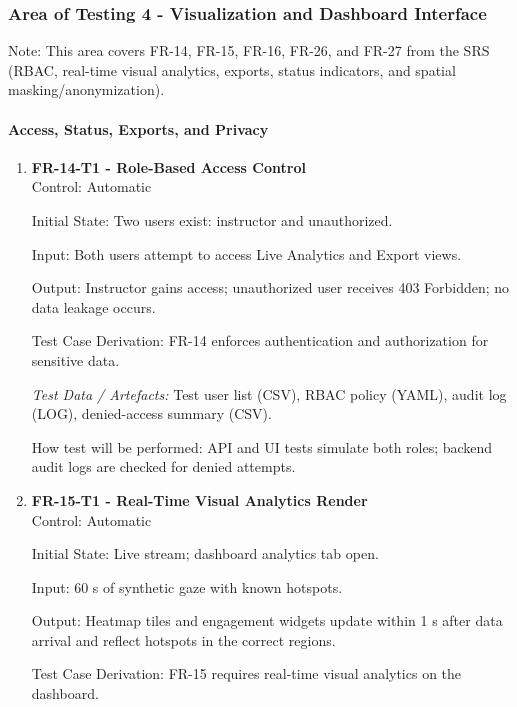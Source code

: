 \documentclass[12pt, titlepage]{article}
\begin{document}
\subsubsection{Area of Testing 4 - Visualization and Dashboard Interface}

Note: This area covers FR-14, FR-15, FR-16, FR-26, and FR-27 from the SRS (RBAC, real-time visual analytics, exports, status indicators, and spatial masking/anonymization).

\paragraph{Access, Status, Exports, and Privacy}

\begin{enumerate}

\item \textbf{FR-14-T1 - Role-Based Access Control} \\

Control: Automatic

Initial State: Two users exist: instructor and unauthorized.

Input: Both users attempt to access Live Analytics and Export views.

Output: Instructor gains access; unauthorized user receives 403 Forbidden; no data leakage occurs.

Test Case Derivation: FR-14 enforces authentication and authorization for sensitive data.

\textit{Test Data / Artefacts:} Test user list (CSV), RBAC policy (YAML), audit log (LOG), denied-access summary (CSV).

How test will be performed: API and UI tests simulate both roles; backend audit logs are checked for denied attempts.

\item \textbf{FR-15-T1 - Real-Time Visual Analytics Render} \\

Control: Automatic

Initial State: Live stream; dashboard analytics tab open.

Input: 60 s of synthetic gaze with known hotspots.

Output: Heatmap tiles and engagement widgets update within 1 s after data arrival and reflect hotspots in the correct regions.

Test Case Derivation: FR-15 requires real-time visual analytics on the dashboard.


\end{enumerate}
\end{document}
